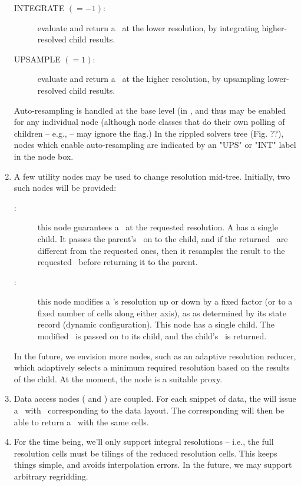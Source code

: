\documentclass[10pt,twoside]{book}
\begin{document}
\begin{enumerate}
\begin{description}
    \item[INTEGRATE $(=-1)$:] evaluate and return a \Result\ at the lower
    resolution, by integrating higher-resolved child results.

    \item[UPSAMPLE $(=1)$:] evaluate and return a \Result\ at the higher
    resolution, by upsampling lower-resolved child results.

    \end{description}
    
  Auto-resampling is handled at the base  level (in
  , and thus may be enabled for any individual node
  (although node classes that do their own polling of children -- e.g.,
   -- may ignore the flag.) In the rippled solvers tree (Fig. ??),
  nodes which enable auto-resampling are indicated by an "UPS" or "INT" label
  in the node box. 

  \item A few utility nodes may be used to change resolution mid-tree.
  Initially, two such nodes will be provided:

    \begin{description}
    
    \item[:] this node guarantees a \Result\ at the requested
    resolution. A  has a single child. It passes the parent's
    \Request\ on to the child, and if the returned \Cells\ are different from
    the requested ones, then it resamples the result to the requested \Cells\
    before returning it to the parent.

    \item[:] this node modifies a \Request's resolution up or down
    by a fixed factor (or to a fixed number of cells along either axis), as as
    determined by its state record (dynamic configuration). This node has a
    single child. The modified \Request\ is passed on to its child, and the
    child's \Result\ is returned.

    \end{description}
    
  In the future, we envision more nodes, such as an adaptive resolution
  reducer, which adaptively selects a minimum required resolution based on the
  results of the child. At the moment, the \qq{ModRes} node is a suitable
  proxy. 

  \item Data access nodes ( and ) are coupled. For each
  snippet of data, the \qq{Sink} will issue a \Request\ with \Cells\
  corresponding to the data layout. The corresponding  will then be
  able to return a \Result\ with the same cells.
  
  \item For the time being, we'll only support integral resolutions -- i.e.,
  the full resolution cells must be tilings of the reduced resolution cells.
  This keeps things simple, and avoids interpolation errors. In the future, we
  may support arbitrary regridding.

  \end{enumerate}
  
\end{document}
